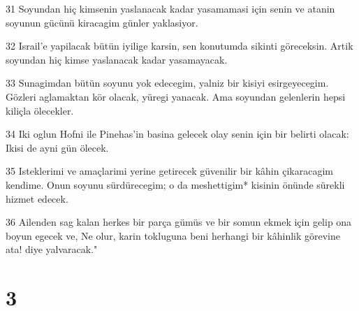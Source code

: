 \par 31 Soyundan hiç kimsenin yaslanacak kadar yasamamasi için senin ve atanin soyunun gücünü kiracagim günler yaklasiyor.
\par 32 Israil'e yapilacak bütün iyilige karsin, sen konutumda sikinti göreceksin. Artik soyundan hiç kimse yaslanacak kadar yasamayacak.
\par 33 Sunagimdan bütün soyunu yok edecegim, yalniz bir kisiyi esirgeyecegim. Gözleri aglamaktan kör olacak, yüregi yanacak. Ama soyundan gelenlerin hepsi kiliçla ölecekler.
\par 34 Iki oglun Hofni ile Pinehas'in basina gelecek olay senin için bir belirti olacak: Ikisi de ayni gün ölecek.
\par 35 Isteklerimi ve amaçlarimi yerine getirecek güvenilir bir kâhin çikaracagim kendime. Onun soyunu sürdürecegim; o da meshettigim* kisinin önünde sürekli hizmet edecek.
\par 36 Ailenden sag kalan herkes bir parça gümüs ve bir somun ekmek için gelip ona boyun egecek ve, Ne olur, karin tokluguna beni herhangi bir kâhinlik görevine ata! diye yalvaracak."

\chapter{3}

